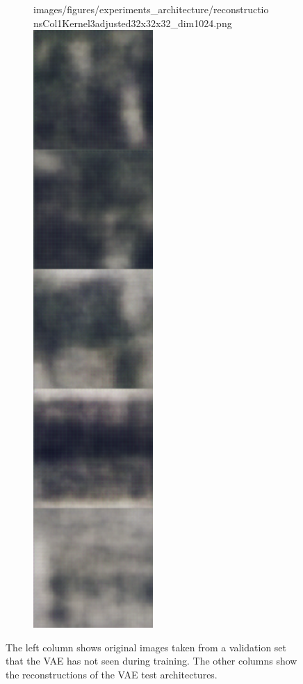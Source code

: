\begin{figure}[H]
\begin{subfigure}[t]{.19\textwidth}
        {images/figures/experiments_architecture/reconstructionsCol1Kernel3adjusted32x32x32_dim1024.png}\hfill
        \includegraphics[width=0.5\textwidth]
        {images/figures/experiments_architecture/reconstructionsCol2Kernel3adjusted32x32x32_dim1024.png}
        \caption{}
    \end{subfigure}
    \caption{The left column shows original images taken from a validation set that the VAE has not seen during
    training. The other columns show the reconstructions of the VAE test architectures.}
\end{figure}


